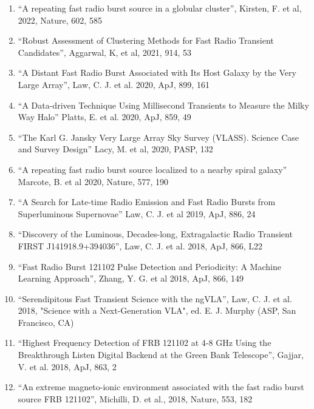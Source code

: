 \documentclass[11pt]{article}
\begin{document}
\begin{enumerate}
    \item ``A repeating fast radio burst source in a globular cluster'', Kirsten, F. et al, 2022, Nature, 602, 585

    \item ``Robust Assessment of Clustering Methods for Fast Radio Transient Candidates'', Aggarwal, K, et al, 2021, 914, 53

    \item ``A Distant Fast Radio Burst Associated with Its Host Galaxy by the Very Large Array'', Law, C. J. et al. 2020, ApJ, 899, 161

    \item ``A Data-driven Technique Using Millisecond Transients to Measure the Milky Way Halo'' Platts, E. et al. 2020, ApJ, 859, 49

    \item ``The Karl G. Jansky Very Large Array Sky Survey (VLASS). Science Case and Survey Design'' Lacy, M. et al, 2020, PASP, 132

    \item ``A repeating fast radio burst source localized to a nearby spiral galaxy'' Marcote, B. et al 2020, Nature, 577, 190

    \item ``A Search for Late-time Radio Emission and Fast Radio Bursts from Superluminous Supernovae'' Law, C. J. et al 2019, ApJ, 886, 24
  
    \item ``Discovery of the Luminous, Decades-long, Extragalactic Radio Transient FIRST J141918.9+394036'', Law, C. J. et al. 2018, ApJ, 866, L22

    \item ``Fast Radio Burst 121102 Pulse Detection and Periodicity: A Machine Learning Approach'', Zhang, Y. G. et al 2018, ApJ, 866, 149

    \item ``Serendipitous Fast Transient Science with the ngVLA'', Law, C. J. et al. 2018, "Science with a Next-Generation VLA", ed. E. J. Murphy (ASP, San Francisco, CA)

    \item ``Highest Frequency Detection of FRB 121102 at 4-8 GHz Using the Breakthrough Listen Digital Backend at the Green Bank Telescope'', Gajjar, V. et al. 2018, ApJ, 863, 2

    \item ``An extreme magneto-ionic environment associated with the fast radio burst source FRB 121102'', Michilli, D. et al., 2018, Nature, 553, 182
    

\end{enumerate}
\end{document}
